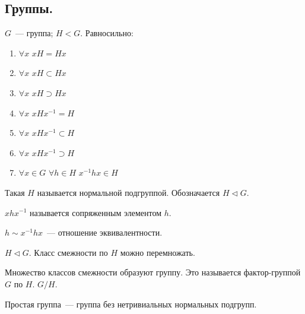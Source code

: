 \documentclass[12pt]{article}
\begin{document}
	\subsection{Группы.}
	\begin{theorem}
		$G$~--- группа; $H < G$. Равносильно:
		\begin{enumerate}
			\item $\forall x$ $xH = Hx$
			\item $\forall x$ $xH \subset Hx$
			\item $\forall x$ $xH \supset Hx$
			\item $\forall x$ $xHx^{-1} = H$
			\item $\forall x$ $xHx^{-1} \subset H$
			\item $\forall x$ $xHx^{-1} \supset H$
			\item $\forall x \in G$ $\forall h \in H$ $x^{-1}hx \in H$
		\end{enumerate}
	\end{theorem}
	\begin{definition}
		Такая $H$ называется нормальной подгруппой. Обозначается $H \vartriangleleft G$.
	\end{definition}
	\begin{definition}
		$xhx^{-1}$ называется сопряженным элементом $h$.
	\end{definition}
	\begin{statement}
		$h \sim x^{-1}hx$~--- отношение эквивалентности.
	\end{statement}
	\begin{definition}
		$H \vartriangleleft G$. Класс смежности по $H$ можно перемножать.
	\end{definition}
	\begin{definition}
		Множество классов смежности образуют группу. Это называется фактор-группой $G$ по $H$. $G/H$.
	\end{definition}
	\begin{definition}
		Простая группа~--- группа без нетривиальных нормальных подгрупп.
	\end{definition}
\end{document}
